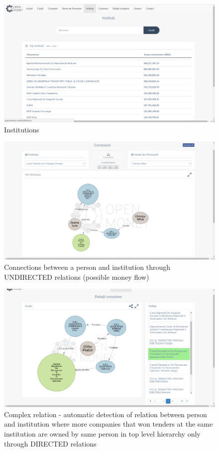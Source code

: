 \documentclass[12pt]{article}
\begin{document}
	\begin{figure}[!ht] 
	\renewcommand\thefigure{6} %
	\centering 
	\includegraphics[width=17cm]{institutions.png} 
	\caption{ Institutions }\label{fig4} 
	\end{figure}
	
	\newpage
	\begin{figure}[!ht] 
	\renewcommand\thefigure{7} %
	\centering 
	\includegraphics[width=17cm]{connections.png} 
	\caption{ Connections between a person and institution through UNDIRECTED relations (possible money flow) }\label{fig4} 
	\end{figure}
	
	\begin{figure}[!ht] 
	\renewcommand\thefigure{8} %
	\centering 
	\includegraphics[width=17cm]{complex_relation.png} 
	\caption{ Complex relation - automatic detection of relation between person and institution where more companies that won tenders at the same institution are owned by same person in top level hierarchy only through DIRECTED relations }\label{fig4} 
	\end{figure}
	
\end{document}
